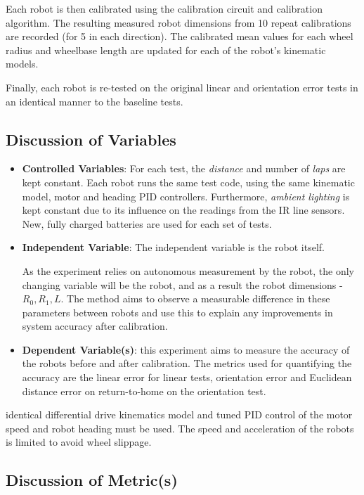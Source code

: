 \documentclass[conference]{IEEEtran}
\begin{document}
Each robot is then calibrated using the calibration circuit and calibration algorithm. 
The resulting measured robot dimensions from 10 repeat calibrations are recorded (for 5 in each direction).
The calibrated mean values for each wheel radius and wheelbase length are updated for each of the robot's kinematic models. 

Finally, each robot is re-tested on the original linear and orientation error tests in an identical manner to the baseline tests. 

\subsection{Discussion of Variables}

\begin{itemize}
    \item \textbf{Controlled Variables}: 
    For each test, the \emph{distance} and number of \emph{laps} are kept constant. 
    Each robot runs the same test code, using the same kinematic model, motor and heading PID controllers. 
    Furthermore, \emph{ambient lighting} is kept constant due to its influence on the readings from the IR line sensors. 
    New, fully charged batteries are used for each set of tests.
    \item \textbf{Independent Variable}: 
    The independent variable is the robot itself. 
    
    
    As the experiment relies on autonomous measurement by the robot, the only changing variable will be the robot, and as a result the robot dimensions - $R_0, R_1, L$. 
    The method aims to observe a measurable difference in these parameters between robots and use this to explain any improvements in system accuracy after calibration. 
    \item \textbf{Dependent Variable(s)}: this experiment aims to measure the accuracy of the robots before and after calibration. The metrics used for quantifying the accuracy are the linear error for linear tests, orientation error and Euclidean distance error on return-to-home on the orientation test.
\end{itemize}

identical differential drive kinematics model and tuned PID control of the motor speed and robot heading must be used. 
The speed and acceleration of the robots is limited to avoid wheel slippage.

\subsection{Discussion of Metric(s)}
\end{document}
